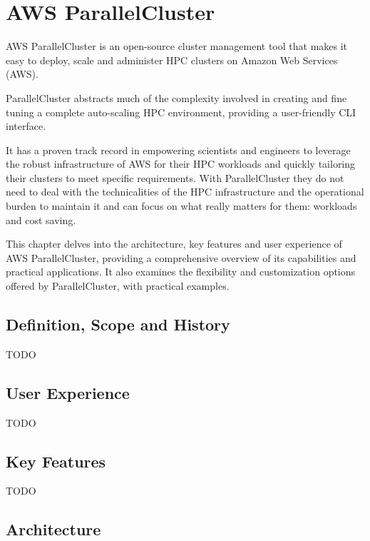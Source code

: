 

\chapter{AWS ParallelCluster}

AWS ParallelCluster is an open-source cluster management tool that makes it easy to deploy, scale and administer HPC clusters on Amazon Web Services (AWS). 

ParallelCluster abstracts much of the complexity involved in creating and fine tuning a complete auto-scaling HPC environment, providing a user-friendly CLI interface.

It has a proven track record in empowering scientists and engineers to leverage the robust infrastructure of AWS for their HPC workloads and quickly tailoring their clusters to meet specific requirements. With ParallelCluster they do not need to deal with the technicalities of the HPC infrastructure and the operational burden to maintain it and can focus on what really matters for them: workloads and cost saving.

This chapter delves into the architecture, key features and user experience of AWS ParallelCluster, providing a comprehensive overview of its capabilities and practical applications. It also examines the flexibility and customization options offered by ParallelCluster, with practical examples.

\section{Definition, Scope and History}

TODO

\section{User Experience}

TODO

\section{Key Features}

TODO

\section{Architecture}

